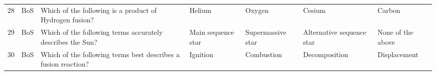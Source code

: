 \documentclass[10pt]{article}
\begin{document}
\begin{tiny}
\begin{longtable}{r P{0.3in} P{1.203in} P{0.8in} P{0.8in} P{0.8in} P{0.8in}}
    28    &     BoS &                                                                                                                                                                                                                          Which of the following is a product of Hydrogen fusion? &                                                                                                                                Helium &                                                                                                Oxygen &                                                                                                                     Cesium &                                                                                                                            Carbon \\
    29    &     BoS &                                                                                                                                                                                                                       Which of the following terms accurately describes the Sun? &                                                                                                                    Main sequence star &                                                                                     Supermassive star &                                                                                                  Alternative sequence star &                                                                                                                 None of the above \\
    30    &     BoS &                                                                                                                                                                                                                   Which of the following terms best describes a fusion reaction? &                                                                                                                              Ignition &                                                                                            Combustion &                                                                                                              Decomposition &                                                                                                                      Displacement \\

\end{longtable}
\end{tiny}
\end{document}
